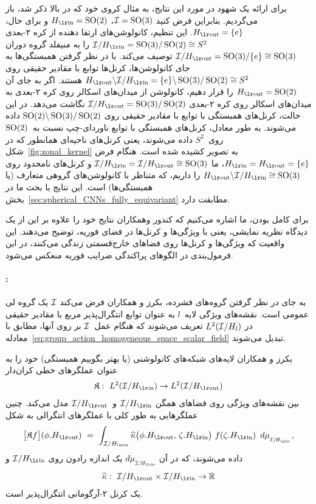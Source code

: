 برای ارائه یک شهود در مورد این نتایج، به مثال  کروی خود که در بالا ذکر شد، باز می‌گردیم.
بنابراین فرض کنید $\mathcal{I}=\operatorname{SO}(3)$، $\Hin=\SO2$ و برای حال، $\Hout=\{e\}$.
این تنظیم، کانولوشن‌های ارتقا دهنده از کره ۲-بعدی $\I/\Hin = \SO3/\SO2 \cong S^2$ را به منیفلد گروه دوران $\I/\Hout = \SO3/\{e\} \cong \SO3$ توصیف می‌کند.
با در نظر گرفتن همبستگی‌ها به جای کانولوشن‌ها، کرنل‌ها توابع با مقادیر حقیقی روی $\Hout\backslash \I/\Hin = \{e\}\backslash \SO3/\SO2 \cong S^2$ هستند.
اگر به جای آن $\Hout=\SO2$ را قرار دهیم، کانولوشن از میدان‌های اسکالر روی کره ۲-بعدی به میدان‌های اسکالر روی کره ۲-بعدی $\I/\Hout = \SO3/\SO2$ نگاشت می‌دهد.
در این حالت، کرنل‌های همبستگی با توابع با مقادیر حقیقی روی $\operatorname{SO}(2)\backslash \operatorname{SO}(3)/\operatorname{SO}(2)$ داده می‌شوند.
به طور معادل، کرنل‌های همبستگی با توابع ناوردای-چپ نسبت به~$\operatorname{SO}(2)$ روی~$S^2$ داده می‌شوند، یعنی کرنل‌های ناحیه‌ای همانطور که در شکل~\ref{fig:zonal_kernel} به تصویر کشیده شده است.
هنگام فرض $\Hin=\Hout=\{e\}$، ما $\I/\Hin = \I/\Hout \cong \SO3$ و کرنل‌های نامحدود روی $\Hout\backslash \I/\Hin \cong \SO3$ را داریم، که متناظر با کانولوشن‌های گروهی متعارف (یا همبستگی‌ها) است.
این نتایج با بحث ما در بخش~\ref{sec:spherical_CNNs_fully_equivariant} مطابقت دارد.


برای کامل بودن، ما اشاره می‌کنیم که کندور وهمکاران\cite{Kondor2018-GENERAL} نتایج خود را علاوه بر این از یک دیدگاه نظریه نمایشی، یعنی با ویژگی‌ها و کرنل‌ها در فضای فوریه، توضیح می‌دهند.
این واقعیت که ویژگی‌ها و کرنل‌ها روی فضاهای خارج‌قسمتی زندگی می‌کنند، در این فرمول‌بندی در الگوهای پراکندگی ضرایب فوریه منعکس می‌شود.








\paragraph{:}

به جای در نظر گرفتن گروه‌های فشرده، بکرز و همکاران\cite{bekkers2020bspline} فرض می‌کند $\mathcal{I}$ یک گروه لی عمومی است.
نقشه‌های ویژگی لایه~$l$ به عنوان توابع انتگرال‌پذیر مربع با مقادیر حقیقی در $L^2(\mathcal{I}/H_l)$ تعریف می‌شوند
که هنگام عمل~$\mathcal{I}$ بر روی آنها، مطابق با معادله~\eqref{eq:group_action_homogeneous_space_scalar_field} تبدیل می‌شوند.

بکرز و همکاران\cite{bekkers2020bspline} لایه‌های شبکه‌های کانولوشنی (یا بهتر بگوییم همبستگی) خود را به عنوان عملگرهای خطی کران‌دار
\begin{align}
	\mathfrak{K}:\ L^2(\I/\Hin) \to L^2(\I/\Hout)
\end{align}
بین نقشه‌های ویژگی روی فضاهای همگن $\I/\Hin$ و~$\I/\Hout$ مدل می‌کند.
چنین عملگرهایی به طور کلی با عملگرهای انتگرالی به شکل
\begin{align}
	\big[\mathfrak{K}f\big] (\phi.\Hout)\ =\ 
	\int_{\I/\Hin} \widehat{\kappa} \big(\phi.\Hout,\, \zeta.\Hin \big)\ f(\zeta.\Hin)\,\ \dmuIHin \,,
\end{align}
داده می‌شوند، که در آن $\dmuIHin$ یک اندازه رادون روی $\I/\Hin$ و
\begin{align}
	\widehat{\kappa}:\ \I/\Hout \times \I/\Hin \to \R
\end{align}
یک کرنل ۲-آرگومانی انتگرال‌پذیر است.

